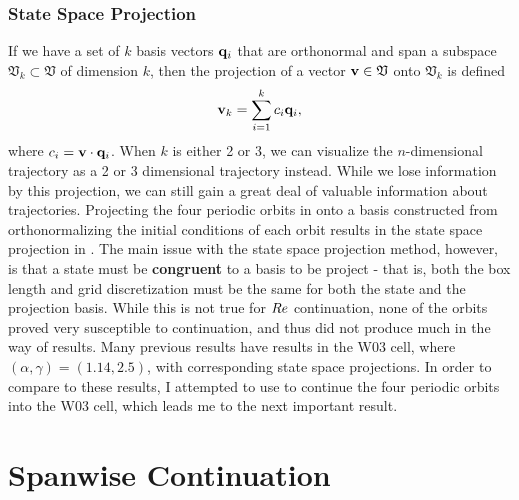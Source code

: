 \subsubsection{State Space Projection}
If we have a set of $k$ basis vectors $\mathbf{q}_i$ that are orthonormal and span a subspace $\mathfrak{V}_k \subset \mathfrak{V}$ of dimension $k$, then the projection of a vector $\mathbf{v} \in \mathfrak{V}$ onto $\mathfrak{V}_k$ is defined 
\begin{equation}
\Vector{v}_k = \sum{i = 1}{k}{c_i \Vector{q}_i},
\end{equation}
where $c_i = \mathbf{v} \cdot \mathbf{q}_i$. When $k$ is either 2 or 3, we can visualize the $n$-dimensional trajectory as a 2 or 3 dimensional trajectory instead. While we lose information by this projection, we can still gain a great deal of valuable information about trajectories. Projecting the four periodic orbits in  onto a basis constructed from orthonormalizing the initial conditions of each orbit results in the state space projection in . The main issue with the state space projection method, however, is that a state must be {\bf congruent} to a basis to be project - that is, both the box length and grid discretization must be the same for both the state and the projection basis. While this is not true for $Re$ continuation, none of the orbits proved very susceptible to \ReN continuation, and thus did not produce much in the way of results. Many previous results have results in the W03 cell, where $(\alpha,\gamma) = (1.14,2.5)$, with corresponding state space projections. In order to compare to these results, I attempted to use  to continue the four periodic orbits into the W03 cell, which leads me to the next important result.

\section{Spanwise Continuation}

